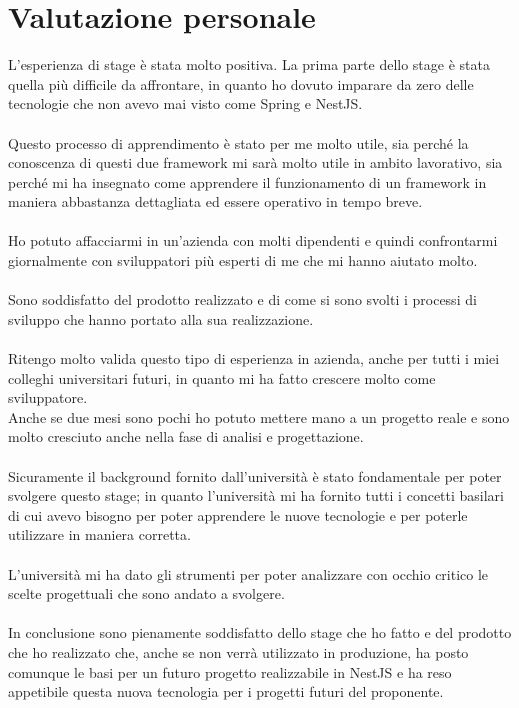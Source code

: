 \section{Valutazione personale}
L'esperienza di stage è stata molto positiva. La prima parte dello stage è stata quella più difficile da affrontare, 
in quanto ho dovuto imparare da zero delle tecnologie che non avevo mai visto come Spring e NestJS.
\\\\
Questo processo di apprendimento è stato per me molto utile, sia perché la conoscenza di questi due framework mi sarà molto
utile in ambito lavorativo, sia perché mi ha insegnato come apprendere il funzionamento di un framework in maniera abbastanza
dettagliata ed essere operativo in tempo breve.
\\\\
Ho potuto affacciarmi in un'azienda con molti dipendenti e quindi confrontarmi giornalmente con sviluppatori più esperti di me che mi hanno
aiutato molto.
\\\\
Sono soddisfatto del prodotto realizzato e di come si sono svolti i processi di sviluppo che hanno portato alla sua realizzazione. 
\\\\
Ritengo molto valida questo tipo di esperienza in azienda, anche per tutti i miei colleghi universitari futuri, in quanto mi ha 
fatto crescere molto come sviluppatore. 
\\
Anche se due mesi sono pochi ho potuto mettere mano a un progetto reale e sono molto cresciuto anche nella fase di analisi e progettazione.
\\\\
Sicuramente il background fornito dall'università è stato fondamentale per poter svolgere questo stage; in quanto l'università mi ha 
fornito tutti i concetti basilari di cui avevo bisogno per poter apprendere le nuove tecnologie e per poterle utilizzare in maniera 
corretta.
\\\\
L'università mi ha dato gli strumenti per poter analizzare con occhio critico le scelte progettuali che sono andato a svolgere.
\\\\
In conclusione sono pienamente soddisfatto dello stage che ho fatto e del prodotto che ho realizzato che, anche se non verrà 
utilizzato in produzione, ha posto comunque le basi per un futuro progetto realizzabile in NestJS e ha reso appetibile questa nuova tecnologia
per i progetti futuri del proponente.